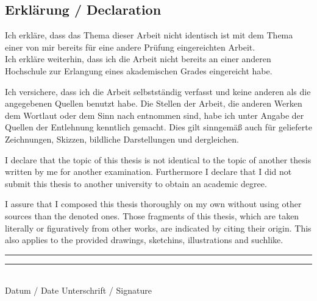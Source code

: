 \documentclass[11pt, a4paper]{article}
\begin{document}
\newpage

\listoffigures

\newpage

{}


\newpage

\thispagestyle{empty}

\begin{center}
\subsection*{Erklärung / Declaration}
\end{center}
\vspace{0.5cm}
Ich erkläre, dass das Thema dieser Arbeit nicht identisch ist mit dem Thema einer von mir bereits für eine andere Prüfung eingereichten Arbeit.\\
Ich erkläre weiterhin, dass ich die Arbeit nicht bereits an einer anderen Hochschule zur Erlangung eines akademischen Grades eingereicht habe.

\vspace{0.8cm}
Ich versichere, dass ich die Arbeit selbstständig verfasst und keine anderen als die angegebenen Quellen benutzt habe. Die Stellen der Arbeit, die anderen Werken dem Wortlaut oder dem Sinn nach entnommen sind, habe ich unter Angabe der Quellen der Entlehnung kenntlich gemacht. Dies gilt sinngemäß auch für gelieferte Zeichnungen, Skizzen, bildliche Darstellungen und dergleichen.

\vspace{2cm}
I declare that the topic of this thesis is not identical to the topic of another thesis written by me for another examination. Furthermore I declare that I did not submit this thesis to another university to obtain an academic degree.

\vspace{0.8cm}
I assure that I composed this thesis thoroughly on my own without using other sources than the denoted ones. Those fragments of this thesis, which are taken literally or figuratively from other works, are indicated by citing their origin. This also applies to the provided drawings, sketchins, illustrations and suchlike.

\vspace{1.5cm}
\rule[0.05cm]{5cm}{0.5pt} \hspace{4.5cm} \rule[0.05cm]{5cm}{0.5pt}\\
Datum / Date \hspace{7.1cm} Unterschrift / Signature
\end{document}
